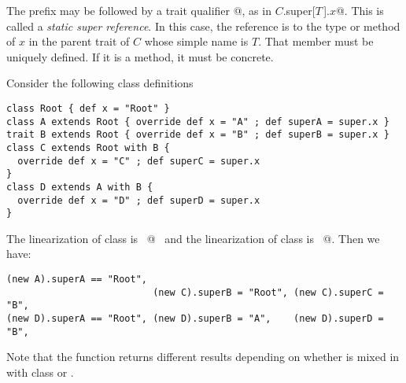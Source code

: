 The  prefix may be followed by a trait qualifier
\lstinline@[$T\,$]@, as in \lstinline@$C$.super[$T\,$].$x$@. This is
called a {\em static super reference}.  In this case, the reference is
to the type or method of $x$ in the parent trait of $C$ whose simple
name is $T$. That member must be uniquely defined. If it is a method,
it must be concrete.

\example\label{ex:super}
Consider the following class definitions

\begin{lstlisting}
class Root { def x = "Root" }
class A extends Root { override def x = "A" ; def superA = super.x }
trait B extends Root { override def x = "B" ; def superB = super.x }
class C extends Root with B { 
  override def x = "C" ; def superC = super.x
}
class D extends A with B {
  override def x = "D" ; def superD = super.x
}
\end{lstlisting}
The linearization of class  is ~@~ and
the linearization of class  is ~@.
Then we have:
\begin{lstlisting}
(new A).superA == "Root", 
                          (new C).superB = "Root", (new C).superC = "B",
(new D).superA == "Root", (new D).superB = "A",    (new D).superD = "B",
\end{lstlisting}
Note that the  function returns different results
depending on whether  is mixed in with class  or .


